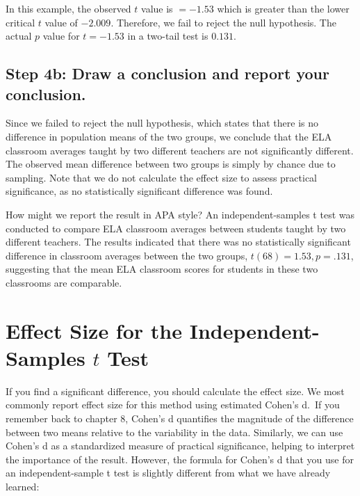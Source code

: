 \documentclass[
  letterpaper,
  DIV=11,
  numbers=noendperiod]{scrreprt}
\begin{document}
In this example, the observed \(t\) value is \(= -1.53\) which is
greater than the lower critical \(t\) value of \(-2.009\). Therefore, we
fail to reject the null hypothesis. The actual \(p\) value for
\(t = -1.53\) in a two-tail test is \(0.131\).

\subsection*{Step 4b: Draw a conclusion and report your
conclusion.\,\,}\label{step-4b-draw-a-conclusion-and-report-your-conclusion.}

Since we failed to reject the null hypothesis, which states that there
is no difference in population means of the two groups, we conclude that
the ELA classroom averages taught by two different teachers are not
significantly different. The observed mean difference between two groups
is simply by chance due to sampling. Note that we do not calculate the
effect size to assess practical significance, as no statistically
significant difference was found.

How might we report the result in APA style? An independent-samples t
test was conducted to compare ELA classroom averages between students
taught by two different teachers. The results indicated that there was
no statistically significant difference in classroom averages between
the two groups, \(t(68) = 1.53, p = .131\), suggesting that the mean ELA
classroom scores for students in these two classrooms are comparable.

\section{\texorpdfstring{Effect Size for the Independent-Samples \(t\)
Test}{Effect Size for the Independent-Samples t Test}}\label{effect-size-for-the-independent-samples-t-test}

If you find a significant difference, you should calculate the effect
size. We most commonly report effect size for this method using
estimated Cohen's d.~If you remember back to chapter 8, Cohen's d
quantifies the magnitude of the difference between two means relative to
the variability in the data. Similarly, we can use Cohen's d as a
standardized measure of practical significance, helping to interpret the
importance of the result. However, the formula for Cohen's d that you
use for an independent-sample t test is slightly different from what we
have already learned:
\end{document}
